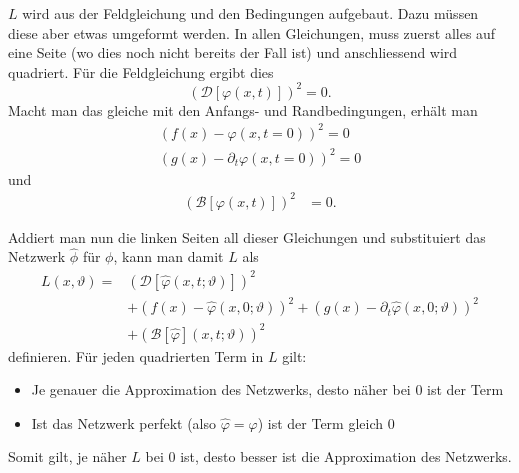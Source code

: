 \( L \) wird aus der Feldgleichung und den Bedingungen aufgebaut. Dazu müssen diese aber etwas umgeformt werden.
In allen Gleichungen, muss zuerst alles auf eine Seite (wo dies noch nicht bereits der Fall ist) und anschliessend wird quadriert.
Für die Feldgleichung ergibt dies
\begin{equation}
    \left(\mathcal{D}[\varphi(x, t)]\right)^2 = 0.
    \label{neuronal:feldgleichung_umformuliert}
\end{equation}
Macht man das gleiche mit den Anfangs- und Randbedingungen, erhält man
\begin{equation}
    \begin{aligned}
        \left(f(x) - \varphi(x, t = 0)\right)^2 = 0\\
        \left(g(x) - \partial_t \varphi(x, t = 0)\right)^2 = 0
    \end{aligned}
    \label{neuronal:anfangsbedingung_umformuliert}
\end{equation}
und
\begin{equation}
    \begin{aligned}
        \left(\mathcal{B}[\varphi(x, t)]\right)^2 &= 0.
    \end{aligned}
    \label{neuronal:randbedingung_umformuliert}
\end{equation}

Addiert man nun die linken Seiten all dieser Gleichungen und substituiert das Netzwerk \( \hat{\phi} \) für \( \phi \), kann man damit \( L \) als
\begin{equation}
    \begin{aligned}
        L(x, \vartheta) = &\left(\mathcal{D}[\hat{\varphi}(x, t; \vartheta)]\right)^2\\
        &+ \left(f(x) - \hat{\varphi}(x, 0; \vartheta)\right)^2
        + \left(g(x) - \partial_t \hat{\varphi}(x, 0; \vartheta)\right)^2\\
        &+ \left(\mathcal{B}[\hat{\varphi}](x, t; \vartheta)\right)^2
    \end{aligned}
    \label{neuronal:optimierung}
\end{equation}
definieren.
Für jeden quadrierten Term in \( L \) gilt:
\begin{itemize}
    \item Je genauer die Approximation des Netzwerks, desto näher bei 0 ist der Term
    \item Ist das Netzwerk perfekt (also \( \hat{\varphi} = \varphi \)) ist der Term gleich 0
\end{itemize}
Somit gilt, je näher \( L \) bei 0 ist, desto besser ist die Approximation des Netzwerks.

